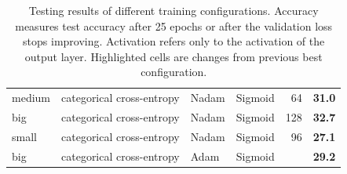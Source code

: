 \documentclass[11pt, twocolumn]{article}
\begin{document}
\begin{table}[]
\begin{tabular}{@{}llllrr@{}}
        \cellcolor[HTML]{FFCCC9}medium & categorical cross-entropy                    & Nadam                         & Sigmoid                         & \multicolumn{1}{r|}{\cellcolor[HTML]{FFCCC9}64}                         & \textbf{31.0}                              \\
        big                            & categorical cross-entropy                    & Nadam                         & Sigmoid                         & \multicolumn{1}{r|}{\cellcolor[HTML]{9AFF99}128}                        & \textbf{32.7}                              \\
        \cellcolor[HTML]{FFCCC9}small  & categorical cross-entropy                    & Nadam                         & Sigmoid                         & \multicolumn{1}{r|}{96}                                                 & \textbf{27.1}                              \\
        big                            & categorical cross-entropy                    & \cellcolor[HTML]{FFCCC9}Adam  & Sigmoid                         & \multicolumn{1}{r|}{\cellcolor[HTML]{FFFFFF}{\color[HTML]{000000} 128}} & \textbf{29.2}                              \\
        \bottomrule
    \end{tabular}
    \caption{Testing results of different training configurations. Accuracy measures test accuracy after 25 epochs or after the validation loss stops improving. Activation refers only to the activation of the output layer. Highlighted cells are changes from previous best configuration. }
    \label{tab:results}
\end{table}
\end{document}
